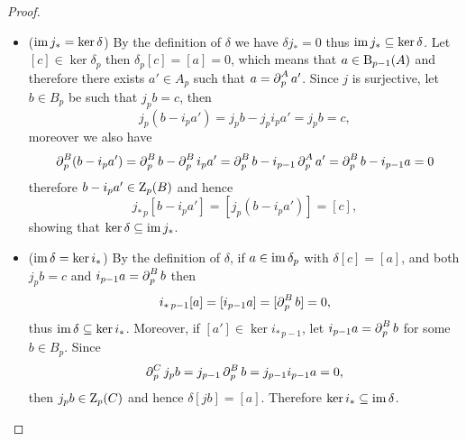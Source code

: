 \begin{proof}
\begin{itemize}
        \item (\(\operatorname{im} j_{*} = \ker \delta\)) By the definition of \(\delta\) we have
              \(\delta j_{*} = 0\) thus \(\operatorname{im} j_{*} \subseteq \ker \delta\). Let
              \([c] \in \ker \delta_p\) then \(\delta_p[c] = [a] = 0\), which means that
              \(a \in \operatorname{B}_{p-1}(A)\) and therefore there exists \(a' \in A_p\) such that
              \(a = \operatorname{\partial}_p^A a'\). Since \(j\) is surjective, let \(b \in B_p\) be such that
              \(j_p b = c\), then
              \[
                  j_p(b - i_p a') = j_p b - j_p i_p a' = j_p b = c,
              \]
              moreover we also have
              \[
                  \operatorname{\partial}_p^B(b - i_p a')
                  = \operatorname{\partial}_p^B b - \operatorname{\partial}_p^B i_p a'
                  = \operatorname{\partial}_p^B b - i_{p-1} \operatorname{\partial}_p^A a'
                  = \operatorname{\partial}_p^B b - i_{p-1} a
                  = 0
              \]
              therefore \(b - i_p a' \in \operatorname{Z}_p(B)\) and hence
              \[
                  j_{*\, p}[b - i_p a'] = [j_p(b - i_p a')] = [c],
              \]
              showing that \(\ker \delta \subseteq \operatorname{im} j_{*}\).

        \item (\(\operatorname{im} \delta = \ker i_{*}\))  By the definition of \(\delta\), if \(a \in \operatorname{im} \delta_p\)
              with \(\delta[c] = [a]\), and both \(j_p b = c\) and \(i_{p-1} a = \operatorname{\partial}_p^B b\) then
              \[
                  i_{*\, p-1}[a] = [i_{p-1} a] = [\operatorname{\partial}_p^B b] = 0,
              \]
              thus \(\operatorname{im} \delta \subseteq \ker i_{*}\). Moreover, if \([a'] \in \ker i_{*\, p-1}\), let
              \(i_{p-1} a = \operatorname{\partial}_p^B b\) for some \(b \in B_p\). Since
              \[
                  \operatorname{\partial}_p^C j_p b = j_{p-1} \operatorname{\partial}_p^B b = j_{p-1} i_{p-1} a = 0,
              \]
              then \(j_p b \in \operatorname{Z}_p(C)\) and hence \(\delta[j b] = [a]\). Therefore
              \(\ker i_{*} \subseteq \operatorname{im} \delta\).
    \end{itemize}
\end{proof}

